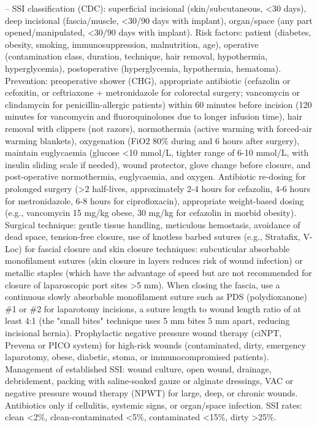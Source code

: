 -- SSI classification (CDC): superficial incisional (skin/subcutaneous, <30 days), deep incisional (fascia/muscle, <30/90 days with implant), organ/space (any part opened/manipulated, <30/90 days with implant). Risk factors: patient (diabetes, obesity, smoking, immunosuppression, malnutrition, age), operative (contamination class, duration, technique, hair removal, hypothermia, hyperglycemia), postoperative (hyperglycemia, hypothermia, hematoma). Prevention: preoperative shower (CHG), appropriate antibiotic (cefazolin or cefoxitin, or ceftriaxone + metronidazole for colorectal surgery; vancomycin or clindamycin for penicillin-allergic patients) within 60 minutes before incision (120 minutes for vancomycin and fluoroquinolones due to longer infusion time), hair removal with clippers (not razors), normothermia (active warming with forced-air warming blankets), oxygenation (FiO2 80\% during and 6 hours after surgery), maintain euglycaemia (glucose <10 mmol/L, tighter range of 6-10 mmol/L, with insulin sliding scale if needed), wound protector, glove change before closure, and post-operative normothermia, euglycaemia, and oxygen. Antibiotic re-dosing for prolonged surgery (>2 half-lives, approximately 2-4 hours for cefazolin, 4-6 hours for metronidazole, 6-8 hours for ciprofloxacin), appropriate weight-based dosing (e.g., vancomycin 15 mg/kg obese, 30 mg/kg for cefazolin in morbid obesity). Surgical technique: gentle tissue handling, meticulous hemostasis, avoidance of dead space, tension-free closure, use of knotless barbed sutures (e.g., Stratafix, V-Loc) for fascial closure and skin closure techniques: subcuticular absorbable monofilament sutures (skin closure in layers reduces risk of wound infection) or metallic staples (which have the advantage of speed but are not recommended for closure of laparoscopic port sites >5 mm). When closing the fascia, use a continuous slowly absorbable monofilament suture such as PDS (polydioxanone) \#1 or \#2 for laparotomy incisions, a suture length to wound length ratio of at least 4:1 (the "small bites" technique uses 5 mm bites 5 mm apart, reducing incisional hernia). Prophylactic negative pressure wound therapy (ciNPT, Prevena or PICO system) for high-risk wounds (contaminated, dirty, emergency laparotomy, obese, diabetic, stoma, or immunocompromised patients). Management of established SSI: wound culture, open wound, drainage, debridement, packing with saline-soaked gauze or alginate dressings, VAC or negative pressure wound therapy (NPWT) for large, deep, or chronic wounds. Antibiotics only if cellulitis, systemic signs, or organ/space infection. SSI rates: clean <2\%, clean-contaminated <5\%, contaminated <15\%, dirty >25\%.

